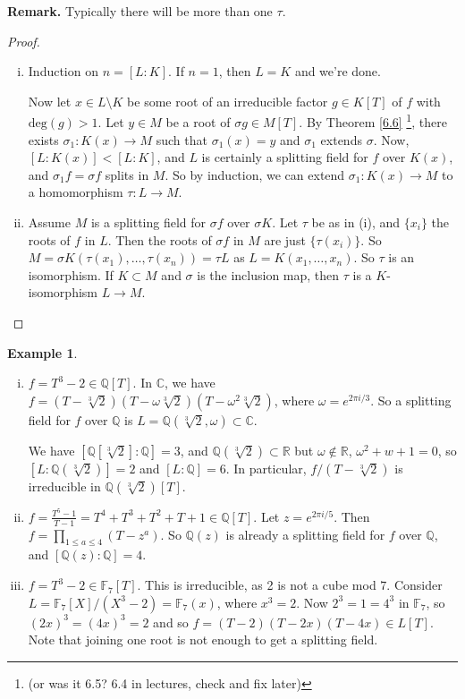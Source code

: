 \documentclass{article}
\theoremstyle{definition}
\newtheorem{example}{Example}[section]
\begin{document}
\textbf{Remark.} Typically there will be more than one $\tau$.

\begin{proof}
    \begin{enumerate}[(i)]
        \item Induction on $n = [L:K]$. If $n=1$, then $L=K$ and we're done.
        
        Now let $x \in L \setminus K$ be some root of an irreducible factor $g \in K[T]$ of $f$ with $\text{deg}(g)>1$. Let $y \in M$ be a root of $\sigma g \in M[T]$. By Theorem \ref{6.6} \footnote{(or was it 6.5? 6.4 in lectures, check and fix later)}, there exists $\sigma_1 : K(x) \to M$ such that $\sigma_1(x) = y$ and $\sigma_1$ extends $\sigma.$ Now, $[L : K(x)] < [L : K]$, and $L$ is certainly a splitting field for $f$ over $K(x)$, and $\sigma_1 f =\sigma f$ splits in $M$. So by induction, we can extend $\sigma_1 : K(x) \to M$ to a homomorphism $\tau : L \to M$.
        \item Assume $M$ is a splitting field for $\sigma f$ over $\sigma K$. Let $\tau$ be as in (i), and $\{x_i\}$ the roots of $f$ in $L$. Then the roots of $\sigma f$ in $M$ are just $\{\tau(x_i)\}$. So $M = \sigma K (\tau(x_1),\ldots,\tau(x_n)) = \tau L$ as $L = K(x_1,\ldots,x_n)$. So $\tau$ is an isomorphism. If $K \subset M$ and $\sigma$ is the inclusion map, then $\tau$ is a $K$-isomorphism $L \to M$. 
    \end{enumerate}
\end{proof}
\begin{example}
    \begin{enumerate}[(i)]
        \item $f = T^3-2 \in \mathbb{Q}[T]$. In $\mathbb{C}$, we have $f=(T-\sqrt[3]{2})(T-\omega \sqrt[3]{2})(T-\omega^2\sqrt[3]{2})$, where $\omega = e^{2 \pi i /3}$. So a splitting field for $f$ over $\mathbb{Q}$ is $L=\mathbb{Q}(\sqrt[3]{2}, \omega) \subset \mathbb{C}$. 
        
        We have $[\mathbb{Q}[\sqrt[3]{2}] : \mathbb{Q}] = 3$, and $\mathbb{Q}(\sqrt[3]{2}) \subset \mathbb{R}$ but $\omega \not\in \mathbb{R}$, $\omega^2+w+1=0$, so $[L : \mathbb{Q}(\sqrt[3]{2})] = 2$ and $[L:\mathbb{Q}]=6$. In particular, $f/(T-\sqrt[3]{2})$ is irreducible in $\mathbb{Q}(\sqrt[3]{2})[T].$
        \item $f = \frac{T^5-1}{T-1} = T^4 + T^3+T^2+T+1 \in \mathbb{Q}[T]$. Let $z = e^{2\pi i/5}$. Then $f = \prod_{1\le a\le 4}^{} (T-z^{a})$. So $\mathbb{Q}(z)$ is already a splitting field for $f$ over $\mathbb{Q}$, and $[\mathbb{Q}(z):\mathbb{Q}]=4$.
        \item $f = T^3-2 \in \mathbb{F}_7[T]$. This is irreducible, as 2 is not a cube mod $7$. Consider $L=\mathbb{F}_7[X]/(X^3-2) = \mathbb{F}_7(x)$, where $x^3=2$. Now $2^3=1=4^3$ in $\mathbb{F}_7$, so $(2x)^3=(4x)^3=2$ and so $f = (T-2)(T-2x)(T-4x) \in L[T]$. Note that joining one root is not enough to get a splitting field.
    \end{enumerate}
\end{example}
\end{document}
